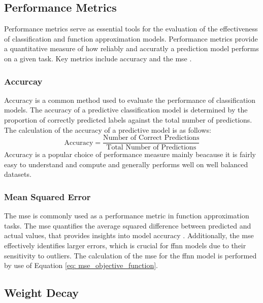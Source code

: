 \documentclass[10pt, conference]{IEEEtran}
\begin{document}
\subsection{Performance Metrics} \label{section: Perf_Metrics_background}

Performance metrics serve as essential tools for the evaluation of the effectiveness of classification
and function approximation models. Performance metrics provide a quantitative measure of how reliably and
accuratly a prediction model performs on a given task. Key metrics include accuracy and the \acrshort{mse}
\cite{performance_metrics_ref}.

\subsubsection{Accurcay}

Accuracy is a common method used to evaluate the performance of classification models. The accuracy of
a predictive classification model is determined by the proportion of correctly predicted labels
against the total number of predictions. The calculation of the accuracy of a predictive model is
as follows:
\begin{equation}
    \text{Accuracy} = \frac{\text{Number of Correct Predictions}}{\text{Total Number of Predictions}} \label{eq: accuracy}
\end{equation}
Accuracy is a popular choice of performance measure mainly beacause it is fairly easy to understand and
compute and generally performs well on well balanced datasets.

\subsubsection{Mean Squared Error}

The \acrshort{mse} is commonly used as a performance metric in function approximation tasks. The \acrshort{mse}
quantifies the average squared difference between predicted and actual values, that provides insights into
model accuracy \cite{mse_ref}. Additionally, the \acrshort{mse} effectively identifies larger errors, which
is crucial for \acrshort{ffnn} models due to their sensitivity to outliers.
The calculation of the \acrshort{mse} for the \acrshort{ffnn} model is performed by use of
Equation \ref{eq: mse_objective_function}.

\subsection{Weight Decay} \label{section: Weight_Decay_background}
\end{document}
